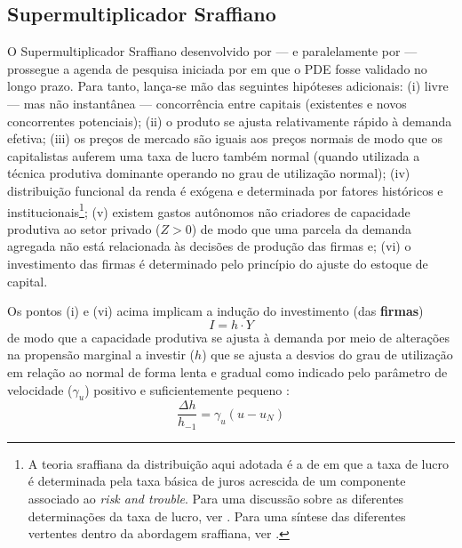\subsection{Supermultiplicador Sraffiano}\label{SecSuper}

O Supermultiplicador Sraffiano desenvolvido por \textcite{serrano_sraffian_1995} --- e paralelamente por \textcite{bortis_institutions_1996} --- prossegue a agenda de pesquisa iniciada por \textcite{garegnani_problem_2015} em que o PDE fosse validado no longo prazo. 
Para tanto, lança-se mão das seguintes hipóteses adicionais: 
	(i) livre --- mas não instantânea --- concorrência entre capitais (existentes e novos concorrentes potenciais);
	(ii) o produto se ajusta relativamente rápido à demanda efetiva;
	(iii) os preços de mercado são iguais aos preços normais de modo que os capitalistas auferem uma taxa de lucro também normal (quando utilizada a técnica produtiva dominante operando no grau de utilização normal);
	(iv) distribuição funcional da renda é exógena e determinada por fatores históricos e institucionais\footnote{
		A teoria sraffiana da distribuição aqui adotada é a de \textcite{pivetti_essay_1992} em que a taxa de lucro é determinada pela taxa básica de juros acrescida de um componente associado ao \textit{risk and trouble}.
		Para uma discussão sobre as diferentes determinações da taxa de lucro, ver \textcite{serrano_teoria_1988}.
		Para uma síntese das diferentes vertentes dentro da abordagem sraffiana, ver \textcite{aspromourgos_sraffian_2004}.
	};
	(v) existem gastos autônomos não criadores de capacidade produtiva ao setor privado ($Z>0$) de modo que uma parcela da demanda agregada não está relacionada às decisões de produção das firmas e;
	(vi) o investimento das firmas é determinado pelo princípio do ajuste do estoque de capital.

Os pontos (i) e (vi) acima implicam a indução do investimento (das \textbf{firmas}) 
$$
I = h\cdot Y
$$
de modo que a capacidade produtiva se ajusta à demanda por meio de alterações na propensão marginal a investir ($h$) que se ajusta a desvios do grau de utilização em relação ao normal de forma lenta e gradual como indicado pelo parâmetro de velocidade ($\gamma_u$) positivo e suficientemente pequeno \cite[p.~271]{freitas_growth_2015}:
$$
\frac{\Delta h}{h_{-1}} = \gamma_u (u - u_N)
$$

